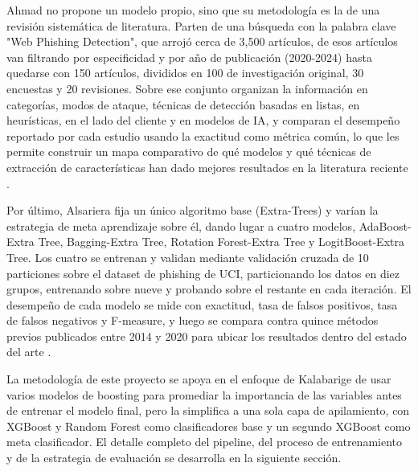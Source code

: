 Ahmad no propone un modelo propio, sino que su metodología es la de una revisión sistemática de literatura. Parten de una búsqueda con la palabra clave "Web Phishing Detection", que arrojó cerca de 3,500 artículos, de esos artículos van filtrando por especificidad y por año de publicación (2020-2024) hasta quedarse con 150 artículos, divididos en 100 de investigación original, 30 encuestas y 20 revisiones. Sobre ese conjunto organizan la información en categorías, modos de ataque, técnicas de detección basadas en listas, en heurísticas, en el lado del cliente y en modelos de IA, y comparan el desempeño reportado por cada estudio usando la exactitud como métrica común, lo que les permite construir un mapa comparativo de qué modelos y qué técnicas de extracción de características han dado mejores resultados en la literatura reciente \cite{ahmad2025across}. \newline

Por último, Alsariera fija un único algoritmo base (Extra-Trees) y varían la estrategia de meta aprendizaje sobre él, dando lugar a cuatro modelos, AdaBoost-Extra Tree, Bagging-Extra Tree, Rotation Forest-Extra Tree y LogitBoost-Extra Tree. Los cuatro se entrenan y validan mediante validación cruzada de 10 particiones sobre el dataset de phishing de UCI, particionando los datos en diez grupos, entrenando sobre nueve y probando sobre el restante en cada iteración. El desempeño de cada modelo se mide con exactitud, tasa de falsos positivos, tasa de falsos negativos y F-measure, y luego se compara contra quince métodos previos publicados entre 2014 y 2020 para ubicar los resultados dentro del estado del arte \cite{alsariera2020ai}. \newline

La metodología de este proyecto se apoya en el enfoque de Kalabarige \cite{kalabarige2023boosting} de usar varios modelos de boosting para promediar la importancia de las variables antes de entrenar el modelo final, pero la simplifica a una sola capa de apilamiento, con XGBoost y Random Forest como clasificadores base y un segundo XGBoost como meta clasificador. El detalle completo del pipeline, del proceso de entrenamiento y de la estrategia de evaluación se desarrolla en la siguiente sección.